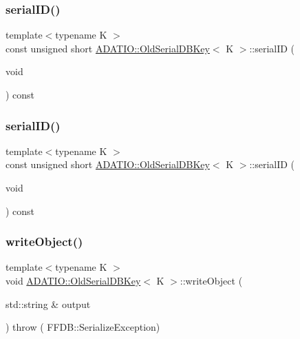 \subsubsection{\texorpdfstring{serialID()}{serialID()}\hspace{0.1cm}{\footnotesize\ttfamily [1/2]}}
{\footnotesize\ttfamily template$<$typename K $>$ \\
const unsigned short \mbox{\hyperlink{classADATIO_1_1OldSerialDBKey}{A\+D\+A\+T\+I\+O\+::\+Old\+Serial\+D\+B\+Key}}$<$ K $>$\+::serial\+ID (\begin{DoxyParamCaption}\item[{void}]{ }\end{DoxyParamCaption}) const\hspace{0.3cm}{\ttfamily [inline]}}

\mbox{\label{classADATIO_1_1OldSerialDBKey_af45528e61ba59f1978d3492534dffd46}} 
\subsubsection{\texorpdfstring{serialID()}{serialID()}\hspace{0.1cm}{\footnotesize\ttfamily [2/2]}}
{\footnotesize\ttfamily template$<$typename K $>$ \\
const unsigned short \mbox{\hyperlink{classADATIO_1_1OldSerialDBKey}{A\+D\+A\+T\+I\+O\+::\+Old\+Serial\+D\+B\+Key}}$<$ K $>$\+::serial\+ID (\begin{DoxyParamCaption}\item[{void}]{ }\end{DoxyParamCaption}) const\hspace{0.3cm}{\ttfamily [inline]}}

\mbox{\label{classADATIO_1_1OldSerialDBKey_a4cc6346697a7bda74b9e14672cf21912}} 
\subsubsection{\texorpdfstring{writeObject()}{writeObject()}\hspace{0.1cm}{\footnotesize\ttfamily [1/2]}}
{\footnotesize\ttfamily template$<$typename K $>$ \\
void \mbox{\hyperlink{classADATIO_1_1OldSerialDBKey}{A\+D\+A\+T\+I\+O\+::\+Old\+Serial\+D\+B\+Key}}$<$ K $>$\+::write\+Object (\begin{DoxyParamCaption}\item[{std\+::string \&}]{output }\end{DoxyParamCaption}) throw ( F\+F\+D\+B\+::\+Serialize\+Exception) \hspace{0.3cm}{\ttfamily [inline]}}

